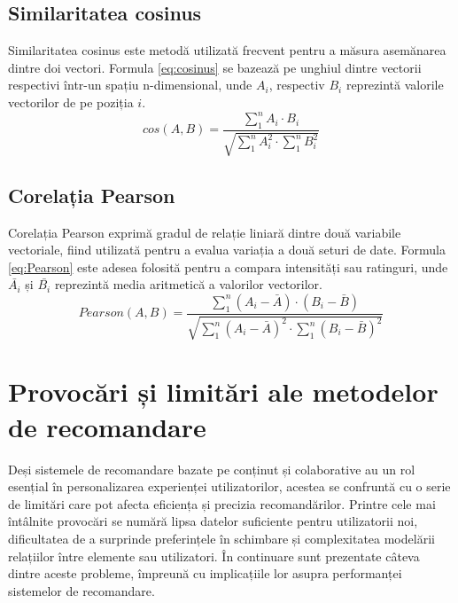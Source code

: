 \subsection{Similaritatea cosinus}
\label{subsec:ch3sec3sub2}
Similaritatea cosinus \cite{al2018similarity} este metodă utilizată frecvent pentru a măsura asemănarea dintre doi vectori. 
Formula \ref{eq:cosinus} se bazează pe unghiul dintre vectorii respectivi într-un spațiu n-dimensional, unde \(A_i\), respectiv \(B_i\) reprezintă valorile vectorilor de pe poziția \(i\).
\begin{equation}
    cos(A, B) = \frac{\sum_1^n A_i \cdot B_i}{\sqrt{\sum_1^n A_i^2 \cdot \sum_1^n B_i^2}}
    \label{eq:cosinus}
\end{equation}

\subsection{Corelația Pearson}
\label{subsec:ch3sec3sub3}
Corelația Pearson \cite{al2018similarity} exprimă gradul de relație liniară dintre două variabile vectoriale, fiind utilizată pentru a evalua variația a două seturi de date.
Formula \ref{eq:Pearson} este adesea folosită pentru a compara intensități sau ratinguri, unde \(\bar{A_i}\) și \(\bar{B_i}\) reprezintă media aritmetică a valorilor vectorilor.
\begin{equation}
    Pearson(A, B) = \frac{\sum_1^n (A_i - \bar{A}) \cdot (B_i - \bar{B})}{\sqrt{\sum_1^n (A_i - \bar{A})^2 \cdot \sum_1^n (B_i - \bar{B})^2}}
    \label{eq:Pearson}
\end{equation}


\section{Provocări și limitări ale metodelor de recomandare}
\label{sec:ch3sec4}
Deși sistemele de recomandare bazate pe conținut și colaborative au un rol esențial în personalizarea experienței utilizatorilor, acestea se confruntă cu o serie de limitări care pot afecta eficiența și precizia recomandărilor. 
Printre cele mai întâlnite provocări se numără lipsa datelor suficiente pentru utilizatorii noi, dificultatea de a surprinde preferințele în schimbare și complexitatea modelării relațiilor între elemente sau utilizatori. 
În continuare sunt prezentate câteva dintre aceste probleme, împreună cu implicațiile lor asupra performanței sistemelor de recomandare.

